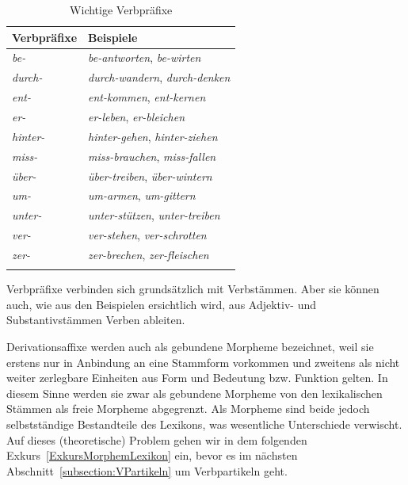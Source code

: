 \begin{table}[!htbp]
  \centering
  \begin{tabular}{l l}
    \lsptoprule
    Verbpräfixe & Beispiele \\
    \hline
    \textit{be-} & \textit{be-antworten}, \textit{be-wirten}\\
    
    \textit{durch-} & \textit{durch-wandern}, \textit{durch-denken}\\ 
    
    \textit{ent-} & \textit{ent-kommen}, \textit{ent-kernen}\\
    
    \textit{er-} & \textit{er-leben}, \textit{er-bleichen}\\
    
    \textit{hinter-} & \textit{hinter-gehen}, \textit{hinter-ziehen}\\ 

    \textit{miss-} & \textit{miss-brauchen}, \textit{miss-fallen}\\
    
    \textit{über-} & \textit{über-treiben}, \textit{über-wintern}\\ 

    \textit{um-} & \textit{um-armen}, \textit{um-gittern}\\ 

    \textit{unter-} & \textit{unter-stützen}, \textit{unter-treiben}\\ 

    \textit{ver-} & \textit{ver-stehen}, \textit{ver-schrotten}\\
    
    \textit{zer-} & \textit{zer-brechen}, \textit{zer-fleischen}\\
    
    \lspbottomrule 
  \end{tabular}
  \caption{Wichtige Verbpräfixe}
  \label{tab:Verbpräfixe}
\end{table}

Verbpräfixe verbinden sich grundsätzlich mit Verbstämmen. Aber sie können auch, wie aus den Beispielen ersichtlich wird, aus Adjektiv- und Substantivstämmen Verben ableiten.

Derivationsaffixe werden auch als gebundene Morpheme bezeichnet, weil sie erstens nur in Anbindung an eine Stammform vorkommen und zweitens als nicht weiter zerlegbare Einheiten aus Form und Bedeutung bzw. Funktion gelten. In diesem Sinne werden sie zwar als gebundene Morpheme von den lexikalischen Stämmen als freie Morpheme abgegrenzt. Als Morpheme sind beide jedoch selbstständige Bestandteile des Lexikons, was wesentliche Unterschiede verwischt. Auf dieses (theoretische) Problem gehen wir in dem folgenden Exkurs~\ref{ExkursMorphemLexikon} ein, bevor es im nächsten Abschnitt~\ref{subsection:VPartikeln} um Verbpartikeln geht.   



